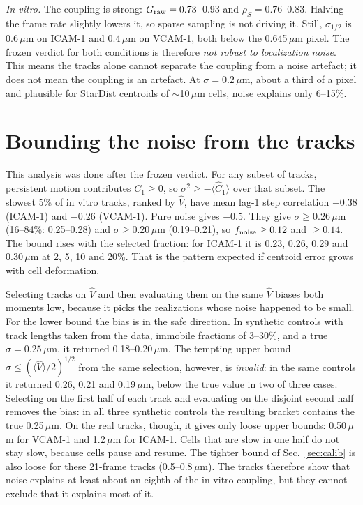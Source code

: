 \documentclass[aps,pre,10pt,twocolumn,superscriptaddress,amsmath,amssymb,floatfix]{revtex4-2}
\begin{document}
\emph{In vitro.} The coupling is strong: $G_{\rm raw}=0.73$--0.93 and $\rho_S=0.76$--0.83. Halving the frame rate slightly lowers it, so sparse sampling is not driving it. Still, $\sigma_{1/2}$ is 0.6\,$\mu$m on ICAM-1 and 0.4\,$\mu$m on VCAM-1, both below the 0.645\,$\mu$m pixel. The frozen verdict for both conditions is therefore \emph{not robust to localization noise}. This means the tracks alone cannot separate the coupling from a noise artefact; it does not mean the coupling is an artefact. At $\sigma=0.2$\,$\mu$m, about a third of a pixel and plausible for StarDist centroids of $\sim$10\,$\mu$m cells, noise explains only 6--15\%.

\section{Bounding the noise from the tracks}
\label{sec:bound}

This analysis was done after the frozen verdict. For any subset of tracks, persistent motion contributes $C_1\ge0$, so $\sigma^2\ge-\langle\hat C_1\rangle$ over that subset. The slowest 5\% of in vitro tracks, ranked by $\hat V$, have mean lag-1 step correlation $-0.38$ (ICAM-1) and $-0.26$ (VCAM-1). Pure noise gives $-0.5$. They give $\sigma\ge0.26$\,$\mu$m (16--84\%: 0.25--0.28) and $\sigma\ge0.20$\,$\mu$m (0.19--0.21), so $f_{\rm noise}\ge0.12$ and $\ge0.14$. The bound rises with the selected fraction: for ICAM-1 it is 0.23, 0.26, 0.29 and 0.30\,$\mu$m at 2, 5, 10 and 20\%. That is the pattern expected if centroid error grows with cell deformation.

Selecting tracks on $\hat V$ and then evaluating them on the same $\hat V$ biases both moments low, because it picks the realizations whose noise happened to be small. For the lower bound the bias is in the safe direction. In synthetic controls with track lengths taken from the data, immobile fractions of 3--30\%, and a true $\sigma=0.25$\,$\mu$m, it returned 0.18--0.20\,$\mu$m. The tempting upper bound $\sigma\le(\langle\hat V\rangle/2)^{1/2}$ from the same selection, however, is \emph{invalid}: in the same controls it returned 0.26, 0.21 and 0.19\,$\mu$m, below the true value in two of three cases. Selecting on the first half of each track and evaluating on the disjoint second half removes the bias: in all three synthetic controls the resulting bracket contains the true 0.25\,$\mu$m. On the real tracks, though, it gives only loose upper bounds: 0.50\,$\mu$m for VCAM-1 and 1.2\,$\mu$m for ICAM-1. Cells that are slow in one half do not stay slow, because cells pause and resume. The tighter bound of Sec.~\ref{sec:calib} is also loose for these 21-frame tracks (0.5--0.8\,$\mu$m). The tracks therefore show that noise explains at least about an eighth of the in vitro coupling, but they cannot exclude that it explains most of it.
\end{document}
